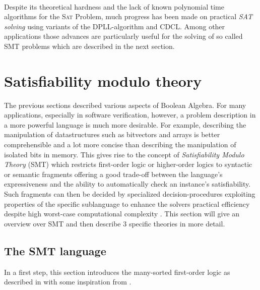 \paragraph{}
Despite its theoretical hardness and the lack of known polynomial time algorithms for the \textsc{Sat} Problem, much progress has been made on practical \textit{SAT solving} using variants of the DPLL-algorithm and CDCL.
Among other applications those advances are particularly useful for the solving of so called SMT problems which are described in the next section.


\section{Satisfiability modulo theory}
The previous sections described various aspects of Boolean Algebra.
For many applications, especially in software verification, however, a problem description in a more powerful language is much more desirable. For example, describing the manipulation of datastructures such as bitvectors and arrays is better comprehensible and a lot more concise than describing the manipulation of isolated bits in memory.
This gives rise to the concept of \textit{Satisfiability Modulo Theory} (SMT) which restricts first-order logic or higher-order logics to syntactic or semantic fragments offering a good trade-off between the language's expressiveness and the ability to automatically check an instance's satisfiability.
Such fragments can then be decided by specialized decision-procedures exploiting properties of the specific sublanguage to enhance the solvers practical efficiency despite high worst-case computational complexity \cite{Barrett-Tinelli-SMT}. This section will give an overview over SMT and then describe 3 specific theories in more detail.

\subsection{The SMT language}
In a first step, this section introduces the many-sorted first-order logic as described in \cite{Barrett-Tinelli-SMT} with some inspiration from \cite{fondements-logique}.

